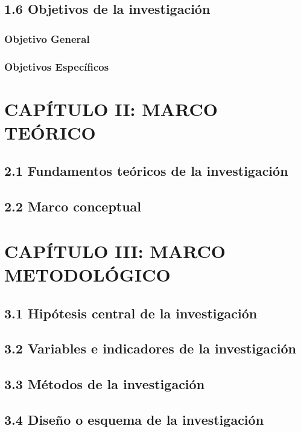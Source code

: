 \documentclass[12pt]{../componentes/uns}
\begin{document}
\subsection{1.6 Objetivos de la investigación}
\subsubsection{Objetivo General}
\lipsum[11]

\subsubsection{Objetivos Específicos}
\lipsum[12]

\newpage
\section{CAPÍTULO II: MARCO TEÓRICO}
\subsection{2.1 Fundamentos teóricos de la investigación}
\lipsum[13]

\subsection{2.2 Marco conceptual}
\lipsum[14]

\newpage
\section{CAPÍTULO III: MARCO METODOLÓGICO}
\subsection{3.1 Hipótesis central de la investigación}
\lipsum[15]

\subsection{3.2 Variables e indicadores de la investigación}
\lipsum[16]

\subsection{3.3 Métodos de la investigación}
\lipsum[17]

\subsection{3.4 Diseño o esquema de la investigación}
\lipsum[18]
\end{document}
